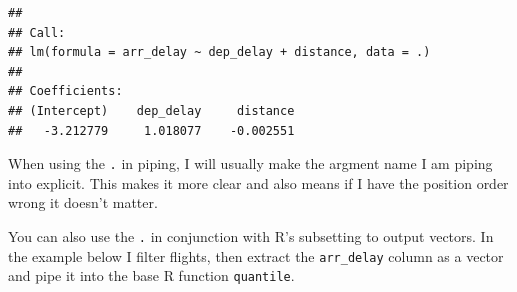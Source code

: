 \documentclass[]{book}
\newenvironment{Shaded}{\begin{snugshade}}{\end{snugshade}}
\newcommand{\DataTypeTok}[1]{\textcolor[rgb]{0.13,0.29,0.53}{#1}}
\newcommand{\DecValTok}[1]{\textcolor[rgb]{0.00,0.00,0.81}{#1}}
\newcommand{\FloatTok}[1]{\textcolor[rgb]{0.00,0.00,0.81}{#1}}
\newcommand{\KeywordTok}[1]{\textcolor[rgb]{0.13,0.29,0.53}{\textbf{#1}}}
\newcommand{\NormalTok}[1]{#1}
\newcommand{\OperatorTok}[1]{\textcolor[rgb]{0.81,0.36,0.00}{\textbf{#1}}}
\newcommand{\StringTok}[1]{\textcolor[rgb]{0.31,0.60,0.02}{#1}}
\theoremstyle{definition}
\theoremstyle{definition}
\theoremstyle{definition}
\theoremstyle{remark}
\begin{document}
\begin{Shaded}
\end{Shaded}

\begin{verbatim}
## 
## Call:
## lm(formula = arr_delay ~ dep_delay + distance, data = .)
## 
## Coefficients:
## (Intercept)    dep_delay     distance  
##   -3.212779     1.018077    -0.002551
\end{verbatim}

When using the \texttt{.} in piping, I will usually make the argment
name I am piping into explicit. This makes it more clear and also means
if I have the position order wrong it doesn't matter.

\begin{Shaded}
\end{Shaded}

You can also use the \texttt{.} in conjunction with R's subsetting to
output vectors. In the example below I filter flights, then extract the
\texttt{arr\_delay} column as a vector and pipe it into the base R
function \texttt{quantile}.

\begin{Shaded}
\end{Shaded}
\end{document}
